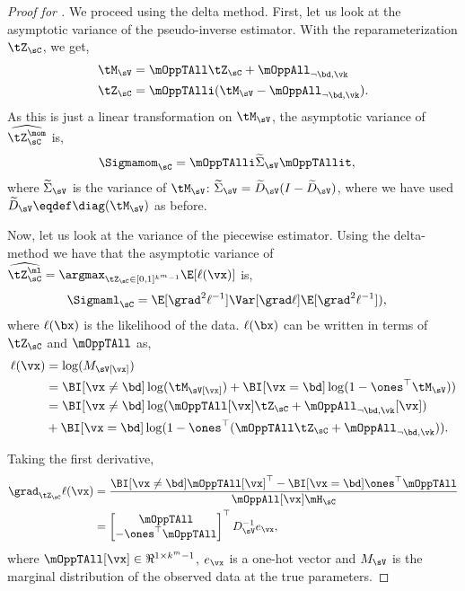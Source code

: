 \begin{proof}[Proof for ]
  We proceed using the delta method. First, let us look at the
  asymptotic variance of the pseudo-inverse estimator. With the
  reparameterization $\tZ_\sC$, we get,
  \begin{align*}
    \tM_\sV &= \mOppTAll \tZ_\sC + \mOppAll_{\neg \bd, \vk} \\
    \tZ_\sC &= \mOppTAlli (\tM_\sV - \mOppAll_{\neg \bd, \vk}).
  \end{align*}
  As this is just a linear transformation on $\tM_\sV$, 
  the asymptotic variance of $\widehat{\tZ^\mom_\sC}$ is,
  \begin{align*}
      \Sigmamom_{\sC} &= \mOppTAlli \widetilde\Sigma_\sV \mOppTAllit,
  \end{align*}
  where $\widetilde\Sigma_\sV$ is the variance of $\tM_\sV$: $\widetilde\Sigma_\sV = \widetilde{D}_\sV
  (I - \widetilde{D}_\sV)$, where we have used $\widetilde D_\sV \eqdef \diag(\tM_\sV)$ as
  before.

  Now, let us look at the variance of the piecewise estimator.  Using
  the delta-method \cite{vaart98asymptotic} we have that the asymptotic
  variance of 
  $\widehat{\tZ^\ml_\sC} = \argmax_{\tZ_\sC \in [0,1]^{k^m-1}} \E[\ell(\vx)]$ is,
  \begin{align*}
    \Sigmaml_\sC &= \E[\grad^2 \ell^{-1}] \Var[\grad \ell] \E[\grad^2 \ell^{-1}]),
  \end{align*}
  where $\ell(\bx)$ is the likelihood of the data. $\ell(\bx)$ can be
  written in terms of $\tZ_\sC$ and $\mOppTAll$ as,
  \begin{align*}
    \ell(\vx) 
              &= \log(M_\sV[\vx]) \\
              &= \BI[\vx \neq \bd] \log(\tM_\sV[\vx]) + \BI[\vx = \bd] \log(1 - \ones^\top \tM_\sV) ) \\
              &= \BI[\vx \neq \bd] \log(\mOppTAll[\vx] \tZ_\sC + \mOppAll_{\neg \bd, \vk}[\vx]) \\
              &+ \BI[\vx = \bd] \log(1 - \ones^\top (\mOppTAll \tZ_\sC + \mOppAll_{\neg \bd, \vk})).
  \end{align*}

Taking the first derivative,
\begin{align}
  \grad_{\tZ_\sC} \ell(\vx)
  &= 
  \frac{\BI[\vx \neq \bd] \mOppTAll[\vx]^\top - \BI[\vx = \bd] \ones^\top \mOppTAll}{\mOppAll[\vx] \mH_\sC} 
  \nonumber \\ 
  &= 
  \begin{bmatrix}
    \mOppTAll \\
    -\ones^\top \mOppTAll
  \end{bmatrix}^\top
  D_{\sV}^{-1} e_\vx, \label{eqn:lhood-grad}
\end{align}
where $\mOppTAll[\vx] \in \Re^{1\times k^m-1}$, $e_\vx$ is a one-hot
vector and $M_\sV$ is the marginal distribution of the observed data at
the true parameters.


\end{proof}
